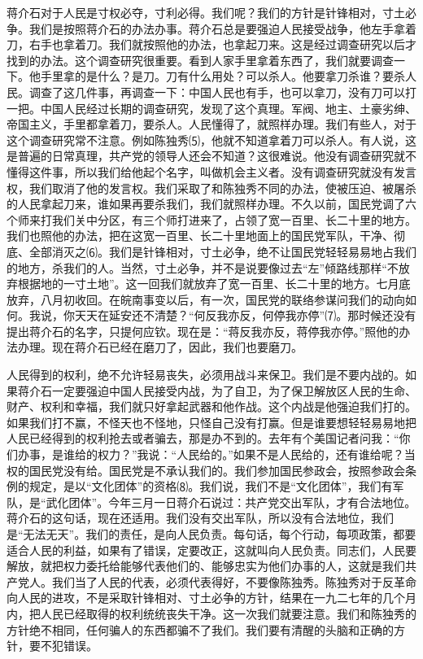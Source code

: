 \documentclass[UTF-8, a5paper, 12pt]{ctexart}
\begin{document}
    蒋介石对于人民是寸权必夺，寸利必得。我们呢？我们的方针是针锋相对，寸土必争。我们是按照蒋介石的办法办事。蒋介石总是要强迫人民接受战争，他左手拿着刀，右手也拿着刀。我们就按照他的办法，也拿起刀来。这是经过调查研究以后才找到的办法。这个调查研究很重要。看到人家手里拿着东西了，我们就要调查一下。他手里拿的是什么？是刀。刀有什么用处？可以杀人。他要拿刀杀谁？要杀人民。调查了这几件事，再调查一下：中国人民也有手，也可以拿刀，没有刀可以打一把。中国人民经过长期的调查研究，发现了这个真理。军阀、地主、土豪劣绅、帝国主义，手里都拿着刀，要杀人。人民懂得了，就照样办理。我们有些人，对于这个调查研究常不注意。例如陈独秀⑸，他就不知道拿着刀可以杀人。有人说，这是普遍的日常真理，共产党的领导人还会不知道？这很难说。他没有调查研究就不懂得这件事，所以我们给他起个名字，叫做机会主义者。没有调查研究就没有发言权，我们取消了他的发言权。我们采取了和陈独秀不同的办法，使被压迫、被屠杀的人民拿起刀来，谁如果再要杀我们，我们就照样办理。不久以前，国民党调了六个师来打我们关中分区，有三个师打进来了，占领了宽一百里、长二十里的地方。我们也照他的办法，把在这宽一百里、长二十里地面上的国民党军队，干净、彻底、全部消灭之⑹。我们是针锋相对，寸土必争，绝不让国民党轻轻易易地占我们的地方，杀我们的人。当然，寸土必争，并不是说要像过去“左”倾路线那样“不放弃根据地的一寸土地”。这一回我们就放弃了宽一百里、长二十里的地方。七月底放弃，八月初收回。在皖南事变以后，有一次，国民党的联络参谋问我们的动向如何。我说，你天天在延安还不清楚？“何反我亦反，何停我亦停”⑺。那时候还没有提出蒋介石的名字，只提何应钦。现在是：“蒋反我亦反，蒋停我亦停。”照他的办法办理。现在蒋介石已经在磨刀了，因此，我们也要磨刀。
    
    人民得到的权利，绝不允许轻易丧失，必须用战斗来保卫。我们是不要内战的。如果蒋介石一定要强迫中国人民接受内战，为了自卫，为了保卫解放区人民的生命、财产、权利和幸福，我们就只好拿起武器和他作战。这个内战是他强迫我们打的。如果我们打不赢，不怪天也不怪地，只怪自己没有打赢。但是谁要想轻轻易易地把人民已经得到的权利抢去或者骗去，那是办不到的。去年有个美国记者问我：“你们办事，是谁给的权力？”我说：“人民给的。”如果不是人民给的，还有谁给呢？当权的国民党没有给。国民党是不承认我们的。我们参加国民参政会，按照参政会条例的规定，是以“文化团体”的资格⑻。我们说，我们不是“文化团体”，我们有军队，是“武化团体”。今年三月一日蒋介石说过：共产党交出军队，才有合法地位。蒋介石的这句话，现在还适用。我们没有交出军队，所以没有合法地位，我们是“无法无天”。我们的责任，是向人民负责。每句话，每个行动，每项政策，都要适合人民的利益，如果有了错误，定要改正，这就叫向人民负责。同志们，人民要解放，就把权力委托给能够代表他们的、能够忠实为他们办事的人，这就是我们共产党人。我们当了人民的代表，必须代表得好，不要像陈独秀。陈独秀对于反革命向人民的进攻，不是采取针锋相对、寸土必争的方针，结果在一九二七年的几个月内，把人民已经取得的权利统统丧失干净。这一次我们就要注意。我们和陈独秀的方针绝不相同，任何骗人的东西都骗不了我们。我们要有清醒的头脑和正确的方针，要不犯错误。
    
\end{document}
